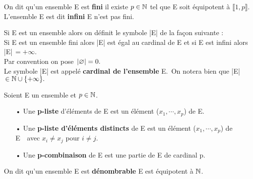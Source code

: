 \vspace{1cm}

\noindent On dit qu'un ensemble E est \textbf{fini} \ssi il existe \(p\in \mathbb{N}\) tel que E soit équipotent à \(\llbracket 1,p \rrbracket\). L'ensemble E est dit \textbf{infini} \ssi E n'est pas fini.

\vspace{1cm}

Si E est un ensemble alors on définit le symbole |E| de la façon suivante :\\
Si E est un ensemble fini alors |E| est égal au cardinal de E et si E est infini alors |E|\(\,=+\infty\).\\
Par convention on pose \(\,|\varnothing|=0.\vspace{0.1cm}\)\\ 
Le symbole |E| est appelé \textbf{cardinal de l'ensemble} E.\, On notera bien que |E|\(\, \in \mathbb{N}\cup \{+\infty\}.\)

\vspace{1.1cm}

Soient E un ensemble et \(p\in \mathbb{N}\).\vspace{-0.1cm}
\begin{itemize}[leftmargin=0.3cm]
    \item[•] Une \textbf{p-liste} d'éléments de E est un élément (\(x_1,\cdots,x_p\)) de E.
    
    \item[•] Une \textbf{p-liste d'éléments distincts} de E est un élément (\(x_1,\cdots,x_p\)) de E\ \ avec \(x_i\neq x_j\) pour \(i\neq j\).
    
    \item[•] Une \textbf{p-combinaison} de E est une partie de E de cardinal p.
\end{itemize}


\vspace{1cm}

\noindent On dit qu'un ensemble E est \textbf{dénombrable} \ssi E est équipotent à \(\mathbb{N}\).

\vspace{1.5cm}

